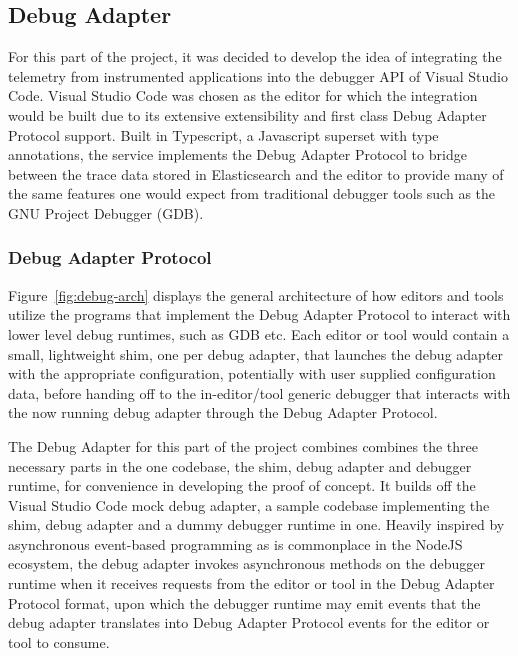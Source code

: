 \documentclass[12pt,pdftex,titlepage]{report}
\begin{document}
            \subsection{Debug Adapter}
                For this part of the project, it was decided to develop the idea of integrating the telemetry from instrumented applications into the debugger API of Visual Studio Code.
                Visual Studio Code was chosen as the editor for which the integration would be built due to its extensive extensibility and first class Debug Adapter Protocol support. 
                Built in Typescript, a Javascript superset with type annotations, the service implements the Debug Adapter Protocol to bridge between the trace data stored in Elasticsearch
                and the editor to provide many of the same features one would expect from traditional debugger tools such as the GNU Project Debugger (GDB).

                \newpage
                \subsubsection{Debug Adapter Protocol}
                    Figure~\ref{fig:debug-arch} displays the general architecture of how editors and tools utilize the programs that implement the Debug Adapter Protocol to interact with
                    lower level debug runtimes, such as GDB etc. Each editor or tool would contain a small, lightweight shim, one per debug adapter, that launches the debug adapter with the
                    appropriate configuration, potentially with user supplied configuration data, before handing off to the in-editor/tool generic debugger that interacts with the now running
                    debug adapter through the Debug Adapter Protocol.

                    The Debug Adapter for this part of the project combines combines the three necessary parts in the one codebase, the shim, debug adapter and debugger runtime, for convenience
                    in developing the proof of concept. It builds off the Visual Studio Code mock debug adapter, a sample codebase implementing the shim, debug adapter and a dummy debugger
                    runtime in one. Heavily inspired by asynchronous event-based programming as is commonplace in the NodeJS ecosystem, the debug adapter invokes asynchronous methods on the 
                    debugger runtime when it receives requests from the editor or tool in the Debug Adapter Protocol format, upon which the debugger runtime may emit events that the debug adapter
                    translates into Debug Adapter Protocol events for the editor or tool to consume.
\end{document}
